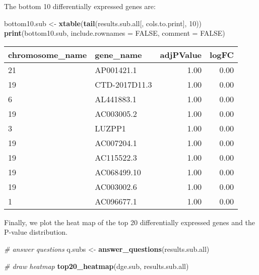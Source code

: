 \documentclass[]{article}
\newenvironment{Shaded}{\begin{snugshade}}{\end{snugshade}}
\newcommand{\KeywordTok}[1]{\textcolor[rgb]{0.13,0.29,0.53}{\textbf{{#1}}}}
\newcommand{\DataTypeTok}[1]{\textcolor[rgb]{0.13,0.29,0.53}{{#1}}}
\newcommand{\DecValTok}[1]{\textcolor[rgb]{0.00,0.00,0.81}{{#1}}}
\newcommand{\StringTok}[1]{\textcolor[rgb]{0.31,0.60,0.02}{{#1}}}
\newcommand{\CommentTok}[1]{\textcolor[rgb]{0.56,0.35,0.01}{\textit{{#1}}}}
\newcommand{\OtherTok}[1]{\textcolor[rgb]{0.56,0.35,0.01}{{#1}}}
\newcommand{\NormalTok}[1]{{#1}}
\begin{document}
The bottom 10 differentially expressed genes are:

\begin{Shaded}
\begin{Highlighting}[]
\NormalTok{bottom10.sub <-}\StringTok{ }\KeywordTok{xtable}\NormalTok{(}\KeywordTok{tail}\NormalTok{(results.sub.all[, cols.to.print], }\DecValTok{10}\NormalTok{))}
\KeywordTok{print}\NormalTok{(bottom10.sub, }\DataTypeTok{include.rownames =} \OtherTok{FALSE}\NormalTok{, }\DataTypeTok{comment =} \OtherTok{FALSE}\NormalTok{)}
\end{Highlighting}
\end{Shaded}

\begin{table}[ht]
\centering
\begin{tabular}{llrr}
  \hline
chromosome\_name & gene\_name & adjPValue & logFC \\ 
  \hline
21 & AP001421.1 & 1.00 & 0.00 \\ 
  19 & CTD-2017D11.3 & 1.00 & 0.00 \\ 
  6 & AL441883.1 & 1.00 & 0.00 \\ 
  19 & AC003005.2 & 1.00 & 0.00 \\ 
  3 & LUZPP1 & 1.00 & 0.00 \\ 
  19 & AC007204.1 & 1.00 & 0.00 \\ 
  19 & AC115522.3 & 1.00 & 0.00 \\ 
  19 & AC068499.10 & 1.00 & 0.00 \\ 
  19 & AC003002.6 & 1.00 & 0.00 \\ 
  1 & AC096677.1 & 1.00 & 0.00 \\ 
   \hline
\end{tabular}
\end{table}

Finally, we plot the heat map of the top 20 differentially expressed
genes and the P-value distribution.

\begin{Shaded}
\begin{Highlighting}[]
\CommentTok{# answer questions}
\NormalTok{q.subs <-}\StringTok{ }\KeywordTok{answer_questions}\NormalTok{(results.sub.all)}
\end{Highlighting}
\end{Shaded}

\begin{Shaded}
\begin{Highlighting}[]
\CommentTok{# draw heatmap}
\KeywordTok{top20_heatmap}\NormalTok{(dge.sub, results.sub.all)}
\end{Highlighting}
\end{Shaded}
\end{document}
